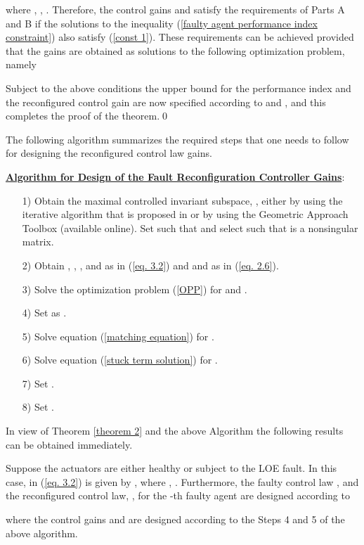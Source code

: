 \documentclass[12pt,draftcls,onecolumn]{IEEEtran}
\begin{document}
where 
, , 
 . Therefore, the control gains  and  satisfy the requirements of Parts A and B if the solutions to the inequality  (\ref{faulty agent performance index constraint}) also satisfy (\ref{const 1}). These requirements can be achieved provided that the gains are obtained as solutions to the following optimization problem, namely

Subject to the above conditions the upper bound for the  performance index  and the reconfigured control gain  are now specified according to  and , and this completes the proof of the theorem.\qed


The following algorithm summarizes the required steps that one needs to follow for designing the reconfigured control law gains.\par
\underline{\textbf{Algorithm for Design of the Fault Reconfiguration Controller Gains}}:\par
\begin{itemize}
\item [1)] Obtain the maximal  controlled invariant subspace, , either by using the iterative algorithm that is proposed in \cite{Basile92} or by using the  Geometric Approach Toolbox\cite{Basil:2010:MISC} (available online). Set  such that  and select  such that  is a nonsingular matrix.
\item [2)] Obtain , , ,  and  as in (\ref{eq. 3.2}) and  and    as in (\ref{eq. 2.6}).
\item [3)] Solve the optimization problem (\ref{OPP}) for  and .
\item [4)] Set  as .
\item [5)] Solve    equation (\ref{matching equation}) for .
\item [6)] Solve equation (\ref{stuck term solution}) for .
\item [7)] Set .
\item [8)] Set .
\end{itemize}\par
In view of  Theorem \ref{theorem 2} and the above Algorithm the following  results can be obtained immediately.
\begin{corollaries}\label{only loe}
Suppose the actuators are either healthy or subject to the LOE fault. 
In this case,  in  (\ref{eq. 3.2}) is given by , where , . Furthermore,  the faulty control law , and the reconfigured control law, ,  for the -th faulty agent   are designed according to
 
 where the control gains  and  are designed according to the Steps 4 and 5 of the above algorithm.
\end{corollaries}
\end{document}
